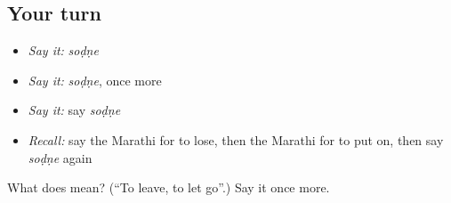 \subsection*{Your turn}
\begin{itemize}
\raggedright
  \item \emph{Say it:} \emph{soḍṇe}
  \item \emph{Say it:} \emph{soḍṇe}, once more
  \item \emph{Say it:} say \emph{soḍṇe}
  \item \emph{Recall:} say the Marathi for to lose, then the Marathi for to put on, then say \emph{soḍṇe} again
\end{itemize}

\begin{tcolorbox}[breakable,colback=teal!4,colframe=teal!35!black,title={Before you move on}]
What does  mean? (\textquotedblleft{}To leave, to let go\textquotedblright{}.) Say it once more.
\end{tcolorbox}

